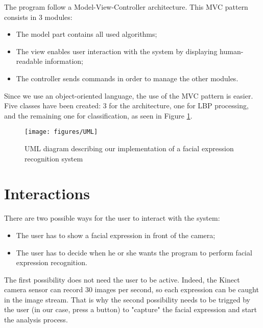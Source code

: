 \vspace{\baselineskip}
\noindent The program follow a Model-View-Controller architecture. This MVC pattern consists in 3 modules:

\begin{itemize}
  \item The model part contains all used algorithms;
  \item The view enables user interaction with the system by displaying human-readable information;
  \item The controller sends commands in order to manage the other modules.
\end{itemize}

\noindent Since we use an object-oriented language, the use of the MVC pattern is easier. Five classes have been created: 3 for the architecture, one for LBP processing, and the remaining one for classification, as seen in Figure \ref{uml}.
\newline

\begin{figure}[!h]
\begin{center}
\noindent \texttt{[image: figures/UML]} 
\newline
\caption{UML diagram describing our implementation of a facial expression recognition system}
\label{uml}
\end{center} 
\end{figure}

\section{Interactions}

\vspace{\baselineskip}
\noindent There are two possible ways for the user to interact with the system:
\begin{itemize}
  \item The user has to show a facial expression in front of the camera;
  \item The user has to decide when he or she wants the program to perform facial expression recognition.
\end{itemize}

\noindent The first possibility does not need the user to be active. Indeed, the Kinect camera sensor can record 30 images per second, so each expression can be caught in the image stream. That is why the second possibility needs to be trigged by the user (in our case, press a button) to "capture" the facial expression and start the analysis process. 


